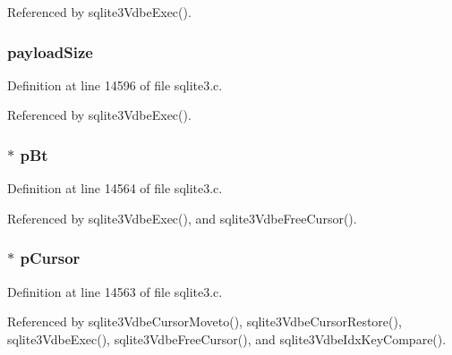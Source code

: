 Referenced by sqlite3\+Vdbe\+Exec().

\hypertarget{struct_vdbe_cursor_a054d7cfc97910464363686b382c5f02a}{}
\subsubsection[{payload\+Size}]{ payload\+Size}\label{struct_vdbe_cursor_a054d7cfc97910464363686b382c5f02a}


Definition at line 14596 of file sqlite3.\+c.



Referenced by sqlite3\+Vdbe\+Exec().

\hypertarget{struct_vdbe_cursor_aea9f10c5940febc27e109d5ec9f9d2af}{}
\subsubsection[{p\+Bt}]{$\ast$ p\+Bt}\label{struct_vdbe_cursor_aea9f10c5940febc27e109d5ec9f9d2af}


Definition at line 14564 of file sqlite3.\+c.



Referenced by sqlite3\+Vdbe\+Exec(), and sqlite3\+Vdbe\+Free\+Cursor().

\hypertarget{struct_vdbe_cursor_a3719d9ea75c17cb66e4f628b8a4bd106}{}
\subsubsection[{p\+Cursor}]{$\ast$ p\+Cursor}\label{struct_vdbe_cursor_a3719d9ea75c17cb66e4f628b8a4bd106}


Definition at line 14563 of file sqlite3.\+c.



Referenced by sqlite3\+Vdbe\+Cursor\+Moveto(), sqlite3\+Vdbe\+Cursor\+Restore(), sqlite3\+Vdbe\+Exec(), sqlite3\+Vdbe\+Free\+Cursor(), and sqlite3\+Vdbe\+Idx\+Key\+Compare().

\hypertarget{struct_vdbe_cursor_a30f00f9ff785feab4d71f2cf58faab84}{}
